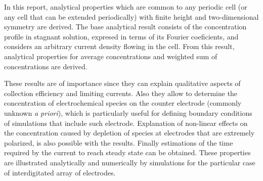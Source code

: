 In this report, analytical properties which are common to any periodic cell
(or any cell that can be extended periodically) with finite height 
and two-dimensional symmetry are derived.
The base analytical result consists of
the concentration profile in stagnant solution,
expresed in terms of its Fourier coeficients,
and considers an arbitrary current density flowing in the cell.
From this result, analytical properties for average concentrations
and weighted sum of concentrations are derived.

These results are of importance since they can explain qualitative aspects
of collection efficiency and limiting currents.
Also they allow to determine the concentration of electrochemical species
on the counter electrode (commonly unknown \emph{a priori}),
which is particularly useful for defining boundary conditions
of simulations that include such electrode.
Explanation of non-linear effects on the concentration
caused by depletion of species at electrodes that are extremely polarized,
is also possible with the results.
Finally estimations of the time required by the current to reach steady state can be obtained.
These properties are illustrated analytically and numerically by simulations
for the particular case of interdigitated array of electrodes.
